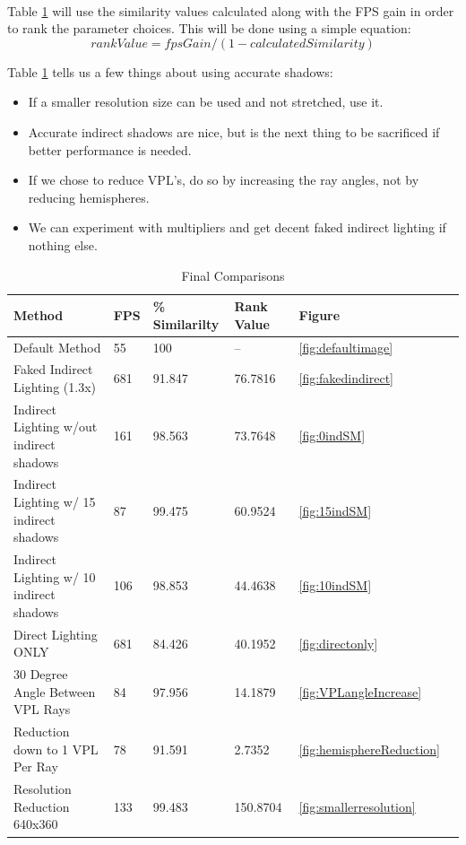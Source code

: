 \paragraph{}
Table \ref{table:5.10} will use the similarity values calculated along with the FPS gain in order to rank the parameter choices.  This will be done using a simple equation:
\begin{equation}
rankValue = fpsGain / (1-calculatedSimilarity)
\end{equation}

Table \ref{table:5.10} tells us a few things about using accurate shadows:
\begin{itemize}
\item If a smaller resolution size can be used and not stretched, use it.
\item Accurate indirect shadows are nice, but is the next thing to be sacrificed if better performance is needed.
\item If we chose to reduce VPL's, do so by increasing the ray angles, not by reducing hemispheres.
\item We can experiment with multipliers and get decent faked indirect lighting if nothing else.
\end{itemize}

\begin{table}[h!]
	\caption{Final Comparisons}
	\begin{center}
	    \begin{tabular}{ | l | l | l | l | l | l |}
	    \hline
	    Method & FPS & \% Similarilty & Rank Value & Figure\\ \hline
	    Default Method & 55 & 100 & -- & \ref{fig:defaultimage}\\ \hline
	    Faked Indirect Lighting (1.3x) & 681 & 91.847 & 76.7816 & \ref{fig:fakedindirect}\\ \hline
	    Indirect Lighting w/out indirect shadows & 161 & 98.563 & 73.7648 & \ref{fig:0indSM}\\ \hline
	    Indirect Lighting w/ 15 indirect shadows & 87 & 99.475 & 60.9524 & \ref{fig:15indSM}\\ \hline
	    Indirect Lighting w/ 10 indirect shadows & 106 & 98.853 & 44.4638 & \ref{fig:10indSM}\\ \hline
	    Direct Lighting ONLY & 681 & 84.426 & 40.1952 & \ref{fig:directonly}\\ \hline
	    30 Degree Angle Between VPL Rays & 84 & 97.956 & 14.1879 & \ref{fig:VPLangleIncrease}\\ \hline
	    Reduction down to 1 VPL Per Ray & 78 & 91.591 & 2.7352 & \ref{fig:hemisphereReduction}\\ \hline
	    Resolution Reduction 640x360 & 133 & 99.483 & 150.8704 & \ref{fig:smallerresolution}\\ \hline
	    \end{tabular}
	\end{center}
	\label{table:5.10}
\end{table}

